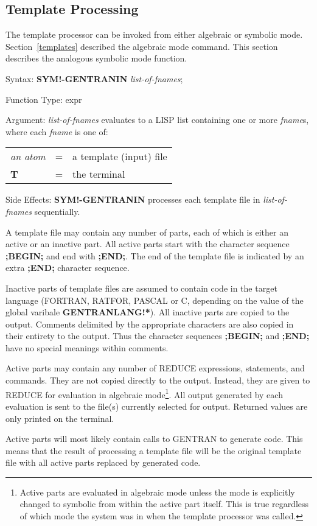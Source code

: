 \subsection{Template Processing}
The template processor can be invoked from either algebraic or
symbolic mode.  Section~\ref{templates} described the algebraic mode
command.  This section describes the analogous symbolic mode function.
\begin{describe}{Syntax:}
{\bf SYM!-GENTRANIN} {\it list-of-fnames\/};
\end{describe} 
\begin{describe}{Function Type:}
expr
\end{describe} 
\begin{describe}{Argument:}
{\it list-of-fnames\/} evaluates to a LISP list containing one or more
{\it fname\/}s, where each {\it fname\/} is one of:

\begin{tabular}{lll}
{\it an atom} & = & a template (input) file\\
{\bf T} & = & the terminal\\
\end{tabular}
\end{describe} 
\begin{describe}{Side Effects:}
{\bf SYM!-GENTRANIN} processes each template file in {\it list-of-fnames\/}
sequentially.

A template file may contain any number of parts, each of which
is either an active or an inactive part.  All active parts start with
the character sequence {\bf ;BEGIN;} and end with {\bf ;END;}.  The end
of the template file is indicated by an extra {\bf ;END;} character sequence.

Inactive parts of template files are assumed to contain code in
the target language (FORTRAN, RATFOR, PASCAL or C, depending on
the value of the global varibale {\bf GENTRANLANG!*}).  All
inactive parts are copied to the output.  Comments delimited
by the appropriate characters are also copied in their entirety
to the output.  Thus the character sequences {\bf ;BEGIN;} and {\bf ;END;}
have no special meanings within comments. 

Active parts may contain any number of REDUCE expressions, statements,
and commands.  They are not copied directly to the output.  Instead,
they are given to REDUCE for evaluation in algebraic mode\footnote{
Active parts are evaluated in algebraic mode unless the mode is
explicitly changed to symbolic from within the active part itself.
This is true regardless of which mode the system was in when the
template processor was called.}.  All output generated by each
evaluation is sent to the file(s) currently selected for output.
Returned values are only printed on the terminal.

Active parts will most likely contain calls to GENTRAN to generate
code.  This means that the result of processing a template file will
be the original template file with all active parts replaced by
generated code.
\end{describe} 
